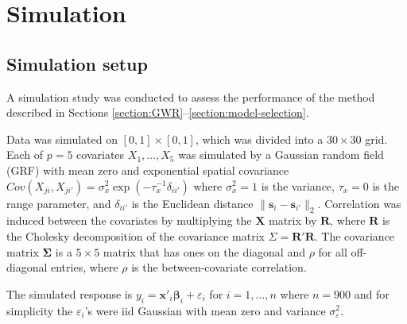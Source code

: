 \documentclass[authoryear, review, 11pt]{elsarticle}
\begin{document}

\section{Simulation \label{sec:simulation}}
	\subsection{Simulation setup}
	A simulation study was conducted to assess the performance of the method described in Sections \ref{section:GWR}--\ref{section:model-selection}. 
	
	Data was simulated on $[0,1] \times [0,1]$, which was divided into a $30 \times 30$ grid. Each of $p=5$ covariates $X_1, \dots, X_5$ was simulated by a Gaussian random field (GRF) with mean zero and exponential spatial covariance $Cov \left(X_{ji}, X_{ji'} \right) = \sigma_x^2 \exp{\left( -\tau_x^{-1} \delta_{ii'} \right)}$ where $\sigma_x^2=1$ is the variance, $\tau_x = 0$ is the range parameter, and $\delta_{ii'}$ is the Euclidean distance $\|\bm{s}_i - \bm{s}_{i'}\|_2$. Correlation was induced between the covariates by multiplying the $\bm{X}$ matrix by $\bm{R}$, where $\bm{R}$ is the Cholesky decomposition of the covariance matrix $\Sigma = \bm{R}'\bm{R}$. The covariance matrix $\bm{\Sigma}$ is a $5 \times 5$ matrix that has ones on the diagonal and $\rho$ for all off-diagonal entries, where $\rho$ is the between-covariate correlation.
		
	The simulated response is $y_i = \bm{x}'_i \bm{\beta}_i + \varepsilon_i$ for $i=1, \dots, n$ where $n=900$ and for simplicity the $\varepsilon_i$'s were iid Gaussian with mean zero and variance $\sigma_\varepsilon^2$.%
	
\end{document}
